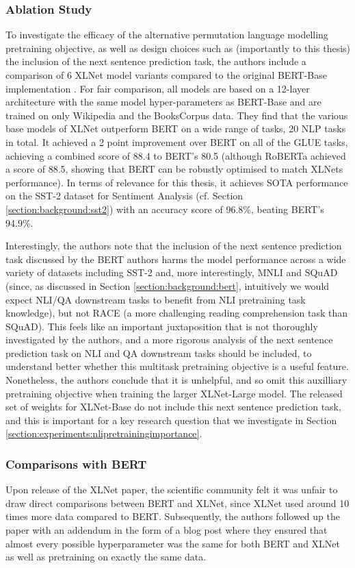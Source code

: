 {{\subsubsection{Ablation Study}
To investigate the efficacy of the alternative permutation language modelling pretraining objective, as well as design choices such as (importantly to this thesis) the inclusion of the next sentence prediction task, the authors include a comparison of 6 XLNet model variants compared to the original BERT-Base implementation \cite{Devlin2018}. For fair comparison, all models are based on a 12-layer architecture with the same model hyper-parameters as BERT-Base and are trained on only Wikipedia and the BooksCorpus data. They find that the various base models of XLNet outperform BERT on a wide range of tasks, 20 NLP tasks in total. It achieved a 2 point improvement over BERT on all of the GLUE tasks, achieving a combined score of 88.4 to BERT's 80.5 (although RoBERTa \cite{Liu2019} achieved a score of 88.5, showing that BERT can be robustly optimised to match XLNets performance). In terms of relevance for this thesis, it achieves SOTA performance on the SST-2 dataset for Sentiment Analysis (cf. Section \ref{section:background:sst2}) with an accuracy score of 96.8\%, beating BERT's 94.9\%.

Interestingly, the authors note that the inclusion of the next sentence prediction task discussed by the BERT authors harms the model performance across a wide variety of datasets including SST-2 and, more interestingly, MNLI and SQuAD (since, as discussed in Section \ref{section:background:bert}, intuitively we would expect NLI/QA downstream tasks to benefit from NLI pretraining task knowledge), but not RACE (a more challenging reading comprehension task than SQuAD). This feels like an important juxtaposition that is not thoroughly investigated by the authors, and a more rigorous analysis of the next sentence prediction task on NLI and QA downstream tasks should be included, to understand better whether this multitask pretraining objective is a useful feature. Nonetheless, the authors conclude that it is unhelpful, and so omit this auxilliary pretraining objective when training the larger XLNet-Large model. The released set of weights for XLNet-Base do not include this next sentence prediction task, and this is important for a key research question that we investigate in Section \ref{section:experiments:nlipretrainingimportance}.

\subsubsection{Comparisons with BERT}
Upon release of the XLNet paper, the scientific community felt it was unfair to draw direct comparisons between BERT and XLNet, since XLNet used around 10 times more data compared to BERT. Subsequently, the authors followed up the paper with an addendum in the form of a blog post \cite{XLNetTeam2019} where they ensured that almost every possible hyperparameter was the same for both BERT and XLNet as well as pretraining on exactly the same data. 

}}
